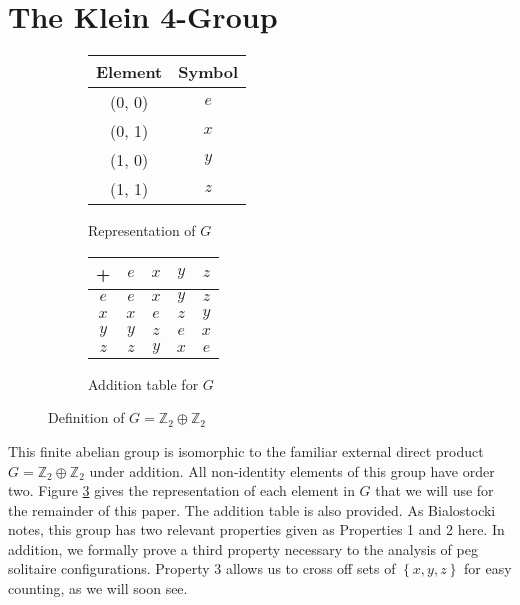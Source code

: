 \documentclass[11pt]{article}
\begin{document}
\section{The Klein 4-Group}
\begin{figure}[h]
\centering
\begin{subfigure}{.5\textwidth}
\centering
\begin{tabular}{c|c}
Element & Symbol \\ \hline
(0, 0) & $e$ \\
(0, 1) & $x$ \\
(1, 0) & $y$ \\
(1, 1) & $z$ \\
\end{tabular}
\caption{Representation of $G$}\label{subfig:G:a}
\end{subfigure}%
\begin{subfigure}{.5\textwidth}
\centering
\begin{tabular}{c|c c c c}
+   & $e$ & $x$ & $y$ & $z$ \\ \hline
$e$ & $e$ & $x$ & $y$ & $z$ \\
$x$ & $x$ & $e$ & $z$ & $y$ \\
$y$ & $y$ & $z$ & $e$ & $x$ \\
$z$ & $z$ & $y$ & $x$ & $e$   \\
\end{tabular}
\caption{Addition table for $G$}\label{subfig:G:b}
\end{subfigure}
\caption{Definition of $G = \mathbb{Z}_2 \oplus \mathbb{Z}_2$}
\label{fig:G}
\end{figure}

This finite abelian group is isomorphic to the familiar external direct product $G = \mathbb{Z}_2 \oplus \mathbb{Z}_2$ under addition. All non-identity elements of this group have order two. Figure \ref{fig:G} gives the representation of each element in $G$ that we will use for the remainder of this paper. The addition table is also provided. As Bialostocki notes, this group has two relevant properties given as Properties 1 and 2 here. In addition, we formally prove a third property necessary to the analysis of peg solitaire configurations. Property 3 allows us to cross off sets of $\left\{x, y, z\right\}$ for easy counting, as we will soon see.
\end{document}
